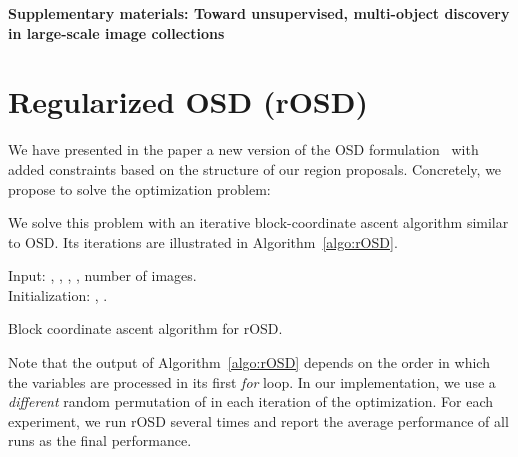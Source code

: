 \documentclass[runningheads]{llncs}
\begin{document}
\clearpage
\begin{center}
    \textbf{\large Supplementary materials: Toward unsupervised, multi-object discovery in large-scale image collections}
\end{center}
\setcounter{section}{0}
\setcounter{table}{0}
\setcounter{figure}{0}
\section{Regularized OSD (rOSD)}
We have presented in the paper a new version of the OSD formulation~\cite{Vo2019UnsupOptim} with added constraints based on the structure of our region proposals. Concretely, we propose to solve the optimization problem:


We solve this problem with an iterative block-coordinate ascent algorithm similar to OSD. Its iterations are illustrated in Algorithm~\ref{algo:rOSD}.

\begin{algorithm}[htb]
\SetAlgoLined
{}
Input: , , , , number  of images.\\
Initialization: , .\\
\caption{Block coordinate ascent algorithm for rOSD.}
\label{algo:rOSD}
\end{algorithm}
Note that the output of Algorithm~\ref{algo:rOSD} depends on the order in which the variables  are processed in its first \textit{for} loop. In our implementation, we use a \textit{different} random permutation of  in each iteration of the optimization. For each experiment, we run rOSD several times and report the average performance of all runs as the final performance.
\end{document}
